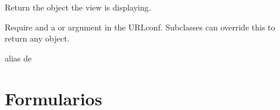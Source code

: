 \documentclass[letterpaper,10pt,spanish]{sphinxmanual}
\begin{document}
\begin{fulllineitems}
\begin{fulllineitems}
\end{fulllineitems}



\begin{fulllineitems}

\pysigstartsignatures
{}
\pysigstopsignatures
\sphinxAtStartPar
Return the object the view is displaying.

\sphinxAtStartPar
Require  and a  or  argument in the URLconf.
Subclasses can override this to return any object.

\end{fulllineitems}



\begin{fulllineitems}

\pysigstartsignatures
{}
\pysigstopsignatures
\sphinxAtStartPar
alias de 

\end{fulllineitems}



\begin{fulllineitems}

\pysigstartsignatures
{}
\pysigstopsignatures
\end{fulllineitems}



\begin{fulllineitems}

\pysigstartsignatures
{}
\pysigstopsignatures
\end{fulllineitems}


\end{fulllineitems}



\section{Formularios}
\label{\detokenize{archivar:formularios}}
\end{document}

